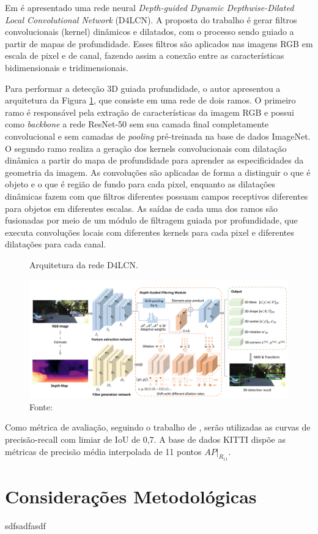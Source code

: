 Em  é apresentado uma rede neural \textit{Depth-guided Dynamic Depthwise-Dilated Local Convolutional Network} (D4LCN). A proposta do trabalho é gerar filtros convolucionais (kernel) dinâmicos e dilatados, com o processo sendo guiado a partir de mapas de profundidade. Esses filtros são aplicados nas imagens RGB em escala de pixel e de canal, fazendo assim a conexão entre as características bidimensionais e tridimensionais.


Para performar a detecção 3D guiada profundidade, o autor apresentou a arquitetura da Figura \ref{fig:d4lcn}, que consiste em uma rede de dois ramos. O primeiro ramo é responsável pela extração de características da imagem RGB e possui como \textit{backbone} a rede ResNet-50 sem sua camada final completamente convolucional e sem camadas de \textit{pooling} pré-treinada na base de dados ImageNet. O segundo ramo realiza a geração dos kernels convolucionais com dilatação dinâmica a partir do mapa de profundidade para aprender as especificidades da geometria da imagem. As convoluções são aplicadas de forma a distinguir o que é objeto e o que é região de fundo para cada pixel, enquanto as dilatações dinâmicas fazem com que filtros diferentes possuam campos receptivos diferentes para objetos em diferentes escalas. As saídas de cada uma dos ramos são fusionadas por meio de um módulo de filtragem guiada por profundidade, que executa convoluções locais com diferentes kernels para cada pixel e diferentes dilatações para cada canal. 




\begin{figure}[H]
    \centering
    \caption{Arquitetura da rede D4LCN. }
    \includegraphics[width=\textwidth]{fig/d4lcn.png}
    \caption*{Fonte: \cite{ding2020learning}}
    \label{fig:d4lcn}
\end{figure}

Como métrica de avaliação, seguindo o trabalho de , serão utilizadas as curvas de precisão-recall com limiar de IoU de 0,7. A base de dados KITTI dispõe as métricas de precisão média interpolada de 11 pontos $AP|_{R_{11}}$.

\section{Considerações Metodológicas}

sdfsadfasdf